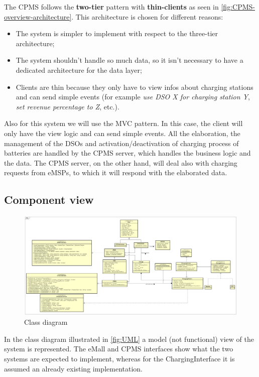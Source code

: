 The \ac{CPMS} follows the \textbf{two-tier} pattern with \textbf{thin-clients} as seen in \autoref{fig:CPMS-overview-architecture}. This architecture is chosen for different reasons:
\begin{itemize}
    \item The system is simpler to implement with respect to the three-tier architecture;
    \item The system shouldn't handle so much data, so it isn't necessary to have a dedicated architecture for the data layer;
    \item Clients are thin because they only have to view infos about charging stations and can send simple events (for example \textit{use \ac{DSO} X for charging station Y}, \textit{set revenue percentage to Z}, etc.).
\end{itemize}
Also for this system we will use the \ac{MVC} pattern. In this case, the client will only have the view logic and can send simple events. All the elaboration, the management of the \acp{DSO} and activation/deactivation of charging process of batteries are handled by the \ac{CPMS} server, which handles the business logic and the data.
The \ac{CPMS} server, on the other hand, will deal also with charging requests from \acp{eMSP}, to which it will respond with the elaborated data.


\subsection{Component view}
\begin{figure}[!h]
    \begin{center}
        \includegraphics[keepaspectratio, width=16cm]{../RASD/RASD/UML.png}
        \caption{Class diagram}
        \label{fig:UML}
    \end{center}
\end{figure}
In the class diagram illustrated in \autoref{fig:UML} a model (not functional) view of the system is represented. The \ac{eMall} and \ac{CPMS} interfaces show what the two systems are expected to implement, whereas for the ChargingInterface it is assumed an already existing implementation.

